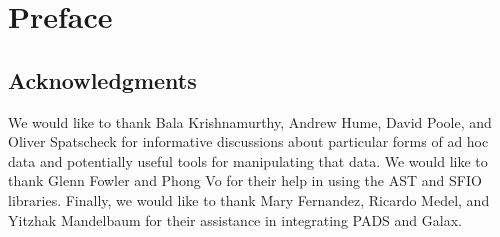 \chapter*{Preface}
\section*{Acknowledgments}
We would like to thank Bala Krishnamurthy, Andrew Hume, David Poole,
and Oliver Spatscheck
for informative discussions about particular forms of ad hoc data
and potentially useful tools for manipulating that data.  
We would like to thank Glenn Fowler and Phong Vo for their help in
using the AST and SFIO libraries.
Finally, we would like to thank Mary Fernandez, Ricardo Medel, and Yitzhak
Mandelbaum for their assistance in integrating PADS and Galax.


